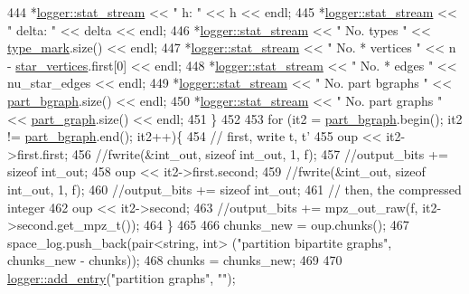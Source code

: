 \begin{DoxyCode}
444     *\hyperlink{classlogger_a7db37821f875f2ba3540980b355779f5}{logger::stat\_stream} << \textcolor{stringliteral}{" h:                "} << h << endl;
445     *\hyperlink{classlogger_a7db37821f875f2ba3540980b355779f5}{logger::stat\_stream} << \textcolor{stringliteral}{" delta:            "} << delta << endl;
446     *\hyperlink{classlogger_a7db37821f875f2ba3540980b355779f5}{logger::stat\_stream} << \textcolor{stringliteral}{" No. types         "} << 
      \hyperlink{classmarked__graph__compressed_a86b00223525703e973415cbc9c94da68}{type\_mark}.size() << endl;
447     *\hyperlink{classlogger_a7db37821f875f2ba3540980b355779f5}{logger::stat\_stream} << \textcolor{stringliteral}{" No. * vertices    "} << n - 
      \hyperlink{classmarked__graph__compressed_a7a4ced4586e2e353f9076bd447df5208}{star\_vertices}.first[0] << endl;
448     *\hyperlink{classlogger_a7db37821f875f2ba3540980b355779f5}{logger::stat\_stream} << \textcolor{stringliteral}{" No. * edges       "} << nu\_star\_edges << endl;
449     *\hyperlink{classlogger_a7db37821f875f2ba3540980b355779f5}{logger::stat\_stream} << \textcolor{stringliteral}{" No. part bgraphs  "} << 
      \hyperlink{classmarked__graph__compressed_a7b3267063fba30b45eb21b3ba4e07536}{part\_bgraph}.size() << endl;
450     *\hyperlink{classlogger_a7db37821f875f2ba3540980b355779f5}{logger::stat\_stream} << \textcolor{stringliteral}{" No. part graphs   "} << 
      \hyperlink{classmarked__graph__compressed_ae179a4737e6eab905c18a94d44ef64b7}{part\_graph}.size() << endl;
451   \}
452 
453   \textcolor{keywordflow}{for} (it2 = \hyperlink{classmarked__graph__compressed_a7b3267063fba30b45eb21b3ba4e07536}{part\_bgraph}.begin(); it2 != \hyperlink{classmarked__graph__compressed_a7b3267063fba30b45eb21b3ba4e07536}{part\_bgraph}.end(); it2++)\{
454     \textcolor{comment}{// first, write t, t'}
455     oup << it2->first.first;
456     \textcolor{comment}{//fwrite(&int\_out, sizeof int\_out, 1, f);}
457     \textcolor{comment}{//output\_bits += sizeof int\_out;}
458     oup <<  it2->first.second;
459     \textcolor{comment}{//fwrite(&int\_out, sizeof int\_out, 1, f);}
460     \textcolor{comment}{//output\_bits += sizeof int\_out;}
461     \textcolor{comment}{// then, the compressed integer}
462     oup << it2->second;
463     \textcolor{comment}{//output\_bits += mpz\_out\_raw(f, it2->second.get\_mpz\_t());}
464   \}
465 
466   chunks\_new = oup.chunks();
467   space\_log.push\_back(pair<string, int> (\textcolor{stringliteral}{"partition bipartite graphs"}, chunks\_new - chunks));
468   chunks = chunks\_new;
469 
470   \hyperlink{classlogger_a710163deb17bc81f70d53d285b8ac9ac}{logger::add\_entry}(\textcolor{stringliteral}{"partition graphs"}, \textcolor{stringliteral}{""});

\end{DoxyCode}
